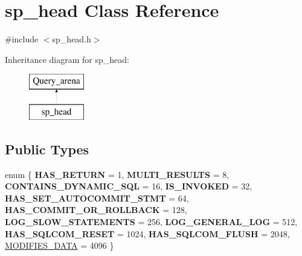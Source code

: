 \hypertarget{classsp__head}{}\section{sp\+\_\+head Class Reference}
\label{classsp__head}


{\ttfamily \#include $<$sp\+\_\+head.\+h$>$}

Inheritance diagram for sp\+\_\+head\+:\begin{figure}[H]
\begin{center}
\leavevmode
\includegraphics[height=2.000000cm]{classsp__head}
\end{center}
\end{figure}
\subsection*{Public Types}
\begin{DoxyCompactItemize}
\item 
enum \{ \newline
{\bfseries H\+A\+S\+\_\+\+R\+E\+T\+U\+RN} = 1, 
{\bfseries M\+U\+L\+T\+I\+\_\+\+R\+E\+S\+U\+L\+TS} = 8, 
{\bfseries C\+O\+N\+T\+A\+I\+N\+S\+\_\+\+D\+Y\+N\+A\+M\+I\+C\+\_\+\+S\+QL} = 16, 
{\bfseries I\+S\+\_\+\+I\+N\+V\+O\+K\+ED} = 32, 
\newline
{\bfseries H\+A\+S\+\_\+\+S\+E\+T\+\_\+\+A\+U\+T\+O\+C\+O\+M\+M\+I\+T\+\_\+\+S\+T\+MT} = 64, 
{\bfseries H\+A\+S\+\_\+\+C\+O\+M\+M\+I\+T\+\_\+\+O\+R\+\_\+\+R\+O\+L\+L\+B\+A\+CK} = 128, 
{\bfseries L\+O\+G\+\_\+\+S\+L\+O\+W\+\_\+\+S\+T\+A\+T\+E\+M\+E\+N\+TS} = 256, 
{\bfseries L\+O\+G\+\_\+\+G\+E\+N\+E\+R\+A\+L\+\_\+\+L\+OG} = 512, 
\newline
{\bfseries H\+A\+S\+\_\+\+S\+Q\+L\+C\+O\+M\+\_\+\+R\+E\+S\+ET} = 1024, 
{\bfseries H\+A\+S\+\_\+\+S\+Q\+L\+C\+O\+M\+\_\+\+F\+L\+U\+SH} = 2048, 
\mbox{\hyperlink{classsp__head_a2c493addd6f76d1338bfda5f5a587371a2b0e1fb757a290996d14136d2f75a931}{M\+O\+D\+I\+F\+I\+E\+S\+\_\+\+D\+A\+TA}} = 4096
 \}
\end{DoxyCompactItemize}
